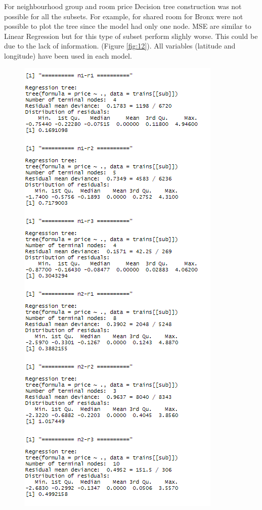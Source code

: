 \documentclass{FR16}
\begin{document}
\noindent For neighbourhood group and room price Decision tree construction was not possible for all the subsets. For example, for shared room for Bronx were not possible to plot the tree since the model had only one node. MSE are similar to Linear Regression but for this type of subset perform slighly worse. This could be due to the lack of information. (Figure \ref{fig:12}). All variables (latitude and longitude) have been used in each model.
\newpage
\begin{figure}[!htb]
   \begin{minipage}{0.48\textwidth}
     \centering
     \includegraphics[width=.7\linewidth]{figures/dt2.PNG} 

\end{minipage}
\end{figure}
\end{document}
